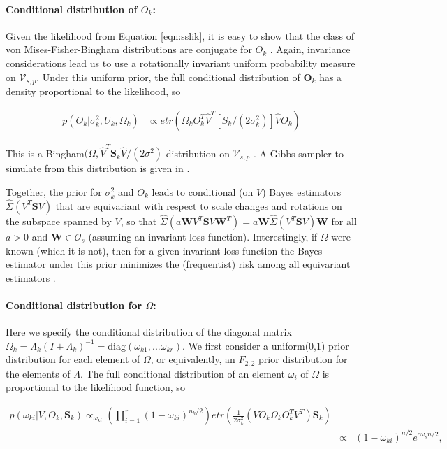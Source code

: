\documentclass{article}
\newcommand{\bl}[1]{{\mathbf #1}}
\begin{document}
\paragraph{Conditional distribution of $O_k$:} Given the likelihood
from Equation \ref{eqn:sslik}, it is easy to show that the class of
von Mises-Fisher-Bingham distributions are conjugate for $O_k$
\citep{Hoff2009, Hoff2012}.  Again, invariance considerations
lead us to use a rotationally invariant uniform probability measure on
$\mathcal V_{s,p}$.  Under this uniform prior, the full conditional
distribution of $\bl O_k$ has a density proportional to the
likelihood, so

\begin{align}
\label{lik_vo}
 p(O_k | \sigma^2_k, U_k, \Omega_k) & \propto etr(\Omega_kO^T_k\hat{V}^T[S_k/(2\sigma^2_k)]\hat{V}O_k)
\end{align}

\noindent This is a Bingham$(\Omega, \hat{V}^T \bl S_k \hat{V}/(2\sigma^2)$
distribution on $\mathcal V_{s, p}$ \citep{Khatri1977}. A
Gibbs sampler to simulate from this distribution is given in
\citet{Hoff2012}.  

Together, the prior for $\sigma_k^2$ and $O_k$ leads to conditional
(on $V$) Bayes estimators $\hat \Sigma(V^T \bl S V)$ that are
equivariant with respect to scale changes and rotations on the
subspace spanned by $V$, so
that $\hat \Sigma(a \bl W V^T \bl S V \bl W^T) = a \bl W \hat\Sigma(V^T
\bl S V) \bl W$
for all $a>0$ and $\bl W\in \mathcal O_{s}$ (assuming an invariant
loss function). Interestingly, if $\Omega$ were known (which it is
not), then for a given invariant loss function the Bayes estimator
under this prior minimizes the (frequentist) risk among all
equivariant estimators \citep{Eaton1989}.

\paragraph{Conditional distribution for $\Omega$:} Here we specify the conditional
distribution of the diagonal matrix $\Omega_k =
\Lambda_k(I+\Lambda_k)^{-1} = \text{diag}(\omega_{k1}, ... \omega_{kr})$.  We first consider a uniform(0,1) prior distribution for each element of $\Omega$, or
equivalently, an $F_{2,2}$ prior distribution for the elements of
$\Lambda$.  The full conditional distribution of an
element $\omega_i$ of $\Omega$ is proportional to the likelihood
function, so

\begin{align}
p(\omega_{ki}|V, O_k, \bl S_k) \propto_{\omega_{ki}}
  \left(\prod_{i=1}^r(1-\omega_{ki})^{n_k/2}  \right)
  etr(\frac{1}{2\sigma_k^2}(VO_k\Omega_kO_k^TV^T)\mathbf{S}_k) \\
&  \propto & (1-\omega_{ki})^{n/2} e^{c \omega_s  n/2},    
\label{eqn:wpost}
\end{align}
\end{document}
